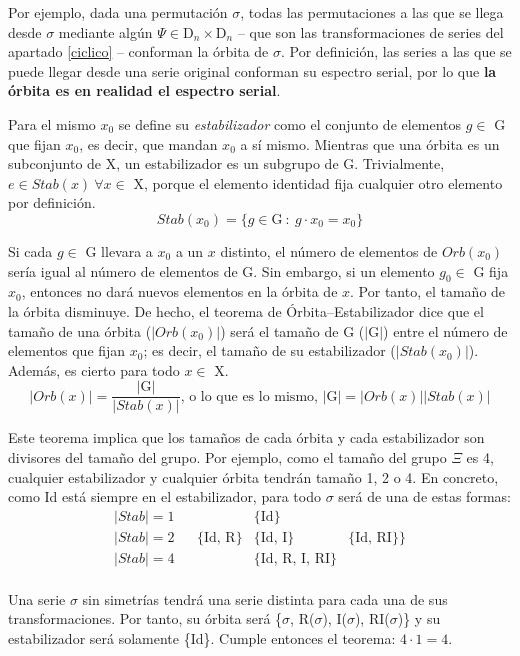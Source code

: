 		Por ejemplo, dada una permutación $\sigma$, todas las permutaciones a las que se llega desde $\sigma$ mediante algún $\Psi\in\text{D}_{n}\times\text{D}_{n}$ -- que son las transformaciones de series del apartado \ref{ciclico} -- conforman la órbita de $\sigma$. Por definición, las series a las que se puede llegar desde una serie original conforman su espectro serial, por lo que \textbf{la órbita es en realidad el espectro serial}.
	
		Para el mismo $x_0$ se define su \emph{estabilizador} como el conjunto de elementos $g\in$ G que fijan $x_0$, es decir, que mandan $x_0$ a sí mismo. Mientras que una órbita es un subconjunto de X, un estabilizador es un subgrupo de G. Trivialmente, $e\in Stab(x) \ \forall x\in$ X, porque el elemento identidad fija cualquier otro elemento por definición.
		\[Stab(x_0)=\{g\in \text{G}\ :\ g\cdot x_0 =x_0 \}\]
	
		Si cada $g\in$ G llevara a $x_0$ a un $x$ distinto, el número de elementos de $Orb(x_0)$ sería igual al número de elementos de G. Sin embargo, si un elemento $g_0\in$ G fija $x_0$, entonces no dará nuevos elementos en la órbita de $x$. Por tanto, el tamaño de la órbita disminuye. De hecho,  el teorema de Órbita--Estabilizador dice que el tamaño de una órbita ($|Orb(x_0)|$) será el tamaño de G ($|$G$|$) entre el número de elementos que fijan $x_0$; es decir, el tamaño de su estabilizador ($|Stab(x_0)|$). Además, es cierto para todo $x\in$ X.
		\[|Orb(x)|=\frac{|\text{G}|}{|Stab(x)|}\text{, o lo que es lo mismo, }|\text{G}|=|Orb(x)||Stab(x)|\]
		
		\def\arraystretch{1.5}
		Este teorema implica que los tamaños de cada órbita y cada estabilizador son divisores del tamaño del grupo. Por ejemplo, como el tamaño del grupo $\Xi$ es 4, cualquier estabilizador y cualquier órbita tendrán tamaño 1, 2 o 4. En concreto, como Id está siempre en el estabilizador, para  todo $\sigma$ será de una de estas formas:
		\[\begin{matrix}|Stab|=1&&&\{\text{Id}\}&\\\hline|Stab|=2&&\{\text{Id, R}\}&\{\text{Id, I}\}&\{\text{Id, RI}\}\}\\\hline|Stab|=4&&&\{\text{Id, R, I, RI}\}&\\\end{matrix}\]
		
		\def\arraystretch{1}
		Una serie $\sigma$ sin simetrías tendrá una serie distinta para cada una de sus transformaciones. Por tanto, su órbita será \{$\sigma$, R($\sigma$), I($\sigma$), RI($\sigma$)\} y su estabilizador será solamente \{Id\}. Cumple entonces el teorema: $4\cdot 1 = 4$.
	
